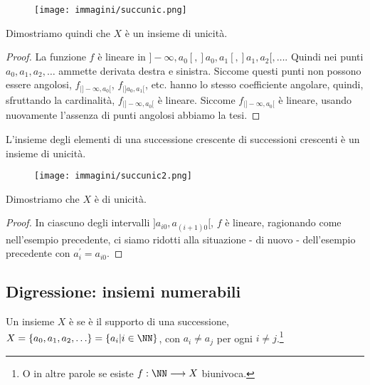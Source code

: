 \documentclass[11pt]{scrartcl}
\begin{document}
\begin{center}
	\begin{figure}[h]
		\centering
		\texttt{[image: immagini/succunic.png]}
	\end{figure}
\end{center}

Dimostriamo quindi che $X$ è un insieme di unicità.
\begin{proof}
La funzione $f$ è lineare in $]-\infty, a_0[, ]a_0,a_1[, ]a_1,a_2[, \ldots$. Quindi nei punti $a_0,a_1,a_2,\ldots$ ammette derivata destra e sinistra. 
Siccome questi punti non possono essere angolosi, $f_{|]-\infty, a_0[}$, $f_{|]a_0,a_1[}$, etc. hanno lo stesso coefficiente angolare, quindi, sfruttando la cardinalità, $f_{|]-\infty, a_0[}$
è lineare. Siccome $f_{|]-\infty, a_0[}$ è lineare, usando nuovamente l'assenza di punti angolosi abbiamo la tesi.
\end{proof}

\begin{examplebb}
L'insieme degli elementi di una successione crescente di successioni crescenti è un insieme di unicità.
\end{examplebb}

\begin{center}
	\begin{figure}[h]
		\centering
		\texttt{[image: immagini/succunic2.png]}
	\end{figure}
\end{center}

Dimostriamo che $X$ è di unicità.
\begin{proof}
In ciascuno degli intervalli $]a_{i0}, a_{(i+1)0}[$, $f$ è lineare, ragionando come nell'esempio precedente, ci siamo ridotti alla situazione
- di nuovo - dell'esempio precedente con $a_i^{\prime} = a_{i0}$.
\end{proof}

\subsection{Digressione: insiemi numerabili}
\begin{definition}
	Un insieme $X$ è  se è il supporto di una successione, $X = \{a_0,a_1,a_2,\ldots\} = \{a_i | i \in \NN\}$, con $a_i \ne a_j$ per ogni $i \ne j$.\footnote{O in altre parole se esiste $f : \NN \longrightarrow X$ biunivoca.}
\end{definition}
\end{document}
